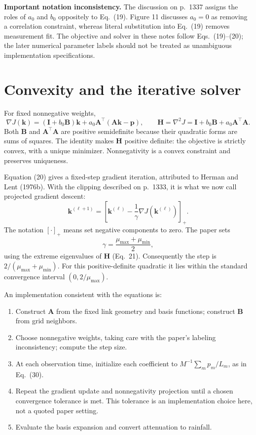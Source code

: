 \documentclass[11pt,a4paper]{article}
\newcommand{\vect}[1]{\mathbf{#1}}
\begin{document}
\textbf{Important notation inconsistency.} The discussion on p.~1337 assigns the roles of $a_0$ and $b_0$ oppositely to Eq.~(19). Figure 11 discusses $a_0=0$ as removing a correlation constraint, whereas literal substitution into Eq.~(19) removes measurement fit. The objective and solver in these notes follow Eqs.~(19)--(20); the later numerical parameter labels should not be treated as unambiguous implementation specifications.
\section{Convexity and the iterative solver}
For fixed nonnegative weights,
\[
\nabla J(\vect k)=(\vect I+b_0\vect B)\vect k
+a_0\vect A^\top(\vect A\vect k-\vect p),\qquad
\vect H=\nabla^2J=\vect I+b_0\vect B+a_0\vect A^\top\vect A.
\]
Both $\vect B$ and $\vect A^\top\vect A$ are positive semidefinite because their quadratic forms are sums of squares. The identity makes $\vect H$ positive definite: the objective is strictly convex, with a unique minimizer. Nonnegativity is a convex constraint and preserves uniqueness.

Equation (20) gives a fixed-step gradient iteration, attributed to Herman and Lent (1976b). With the clipping described on p.~1333, it is what we now call projected gradient descent:
\begin{equation}
\vect k^{(\ell+1)}=\left[\vect k^{(\ell)}-\frac1\gamma\nabla J(\vect k^{(\ell)})\right]_+.
\end{equation}
The notation $[\cdot]_+$ means set negative components to zero. The paper sets
\[
\gamma=\frac{\mu_{\max}+\mu_{\min}}2,
\]
using the extreme eigenvalues of $\vect H$ (Eq.~21). Consequently the step is $2/(\mu_{\max}+\mu_{\min})$. For this positive-definite quadratic it lies within the standard convergence interval $(0,2/\mu_{\max})$.

An implementation consistent with the equations is:
\begin{enumerate}
\item Construct $\vect A$ from the fixed link geometry and basis functions; construct $\vect B$ from grid neighbors.
\item Choose nonnegative weights, taking care with the paper's labeling inconsistency; compute the step size.
\item At each observation time, initialize each coefficient to $M^{-1}\sum_m p_m/L_m$, as in Eq.~(30).
\item Repeat the gradient update and nonnegativity projection until a chosen convergence tolerance is met. This tolerance is an implementation choice here, not a quoted paper setting.
\item Evaluate the basis expansion and convert attenuation to rainfall.
\end{enumerate}
\end{document}
